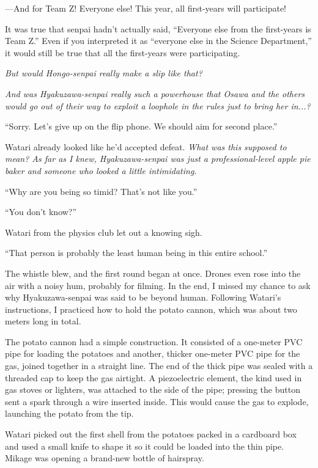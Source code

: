 \documentclass[
    a4paper,
    12pt,
    twoside,
    openany,
    UTF8,
    fontset=windows
]{ctexbook}
\begin{document}
---And for Team Z! Everyone else! This year, all first-years will participate!

It was true that senpai hadn't actually said, ``Everyone else from the first-years is Team Z.'' Even if you interpreted it as ``everyone else in the Science Department,'' it would still be true that all the first-years were participating.

\textit{But would Hongo-senpai really make a slip like that?}

\textit{And was Hyakuzawa-senpai really such a powerhouse that Osawa and the others would go out of their way to exploit a loophole in the rules just to bring her in...?}

``Sorry. Let's give up on the flip phone. We should aim for second place.''

Watari already looked like he'd accepted defeat. \textit{What was this supposed to mean? As far as I knew, Hyakuzawa-senpai was just a professional-level apple pie baker and someone who looked a little intimidating.}

``Why are you being so timid? That's not like you.''

``You don't know?''

Watari from the physics club let out a knowing sigh.

``That person is probably the least human being in this entire school.''

The whistle blew, and the first round began at once. Drones even rose into the air with a noisy hum, probably for filming. In the end, I missed my chance to ask why Hyakuzawa-senpai was said to be beyond human. Following Watari's instructions, I practiced how to hold the potato cannon, which was about two meters long in total.

The potato cannon had a simple construction. It consisted of a one-meter PVC pipe for loading the potatoes and another, thicker one-meter PVC pipe for the gas, joined together in a straight line. The end of the thick pipe was sealed with a threaded cap to keep the gas airtight. A piezoelectric element, the kind used in gas stoves or lighters, was attached to the side of the pipe; pressing the button sent a spark through a wire inserted inside. This would cause the gas to explode, launching the potato from the tip.

Watari picked out the first shell from the potatoes packed in a cardboard box and used a small knife to shape it so it could be loaded into the thin pipe. Mikage was opening a brand-new bottle of hairspray.
\end{document}
